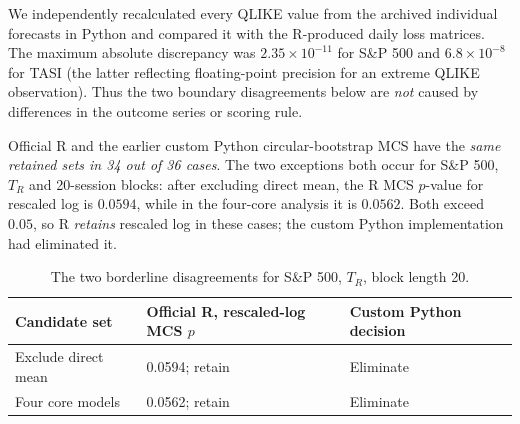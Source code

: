 We independently recalculated every QLIKE value from the archived individual
forecasts in Python and compared it with the R-produced daily loss matrices.
The maximum absolute discrepancy was $2.35\times10^{-11}$ for S\&P 500 and
$6.8\times10^{-8}$ for TASI (the latter reflecting floating-point precision for an extreme
QLIKE observation). Thus the two boundary disagreements below are \emph{not}
caused by differences in the outcome series or scoring rule.

\begin{table}[ht]
\centering\small
\caption{Official R \texttt{MCS} retained sets for the baseline 10-session block
($B=4{,}999$; all runs at 95\% confidence). ``Core'' denotes EWMA,
HAR-SR2, Poisson and rescaled log.}\label{tab:official_R}
\end{table}

Official R and the earlier custom Python circular-bootstrap MCS have the
\emph{same retained sets in 34 out of 36 cases}. The two exceptions both occur
for S\&P 500, $T_R$ and 20-session blocks: after excluding direct mean,
the R MCS $p$-value for rescaled log is $0.0594$, while in the four-core
analysis it is $0.0562$. Both exceed $0.05$, so R \emph{retains} rescaled
log in these cases; the custom Python implementation had eliminated it.

\begin{table}[ht]
\centering\small
\caption{The two borderline disagreements for S\&P 500, $T_R$, block length 20.}
\label{tab:rmcs_differences}
\begin{tabular}{p{.37\linewidth}p{.27\linewidth}p{.22\linewidth}}\toprule
Candidate set & Official R, rescaled-log MCS $p$ & Custom Python decision \\\midrule
Exclude direct mean & 0.0594; retain & Eliminate \\
Four core models & 0.0562; retain & Eliminate \\
\bottomrule\end{tabular}
\end{table}

